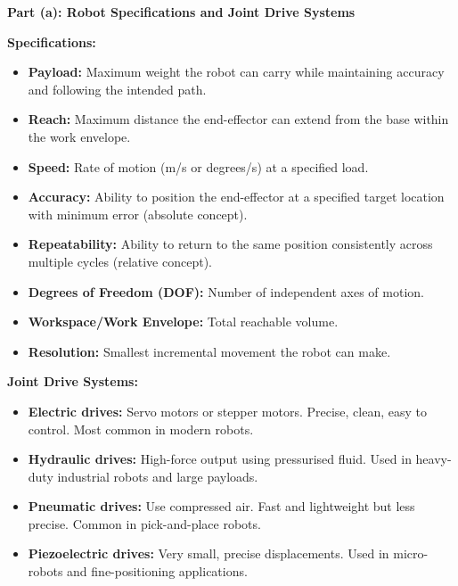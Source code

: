 \documentclass[12pt,a3paper]{article}
\begin{document}
\begin{enumerate}
\begin{tcolorbox}[enhanced,breakable,ansbox,colback=cA!4,colframe=cA,
  boxrule=0.8pt,arc=5pt,
  title={\textbf{Answer}},fonttitle=\bfseries\color{white},colbacktitle=cA]

\textbf{Part (a): Robot Specifications and Joint Drive Systems}

\textbf{Specifications:}
\begin{itemize}[leftmargin=1.5em,itemsep=2pt]
  \item \textbf{Payload:} Maximum weight the robot can carry while maintaining
        accuracy and following the intended path.
  \item \textbf{Reach:} Maximum distance the end-effector can extend from the
        base within the work envelope.
  \item \textbf{Speed:} Rate of motion (m/s or degrees/s) at a specified load.
  \item \textbf{Accuracy:} Ability to position the end-effector at a specified
        target location with minimum error (absolute concept).
  \item \textbf{Repeatability:} Ability to return to the same position
        consistently across multiple cycles (relative concept).
  \item \textbf{Degrees of Freedom (DOF):} Number of independent axes of motion.
  \item \textbf{Workspace/Work Envelope:} Total reachable volume.
  \item \textbf{Resolution:} Smallest incremental movement the robot can make.
\end{itemize}

\textbf{Joint Drive Systems:}
\begin{itemize}[leftmargin=1.5em,itemsep=2pt]
  \item \textbf{Electric drives:} Servo motors or stepper motors. Precise,
        clean, easy to control. Most common in modern robots.
  \item \textbf{Hydraulic drives:} High-force output using pressurised fluid.
        Used in heavy-duty industrial robots and large payloads.
  \item \textbf{Pneumatic drives:} Use compressed air. Fast and lightweight
        but less precise. Common in pick-and-place robots.
  \item \textbf{Piezoelectric drives:} Very small, precise displacements.
        Used in micro-robots and fine-positioning applications.
\end{itemize}


\end{tcolorbox}
\end{enumerate}
\end{document}

